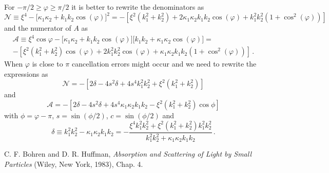 \documentclass[onecolumn%
              ,superscriptaddress%
              ,aps%
              ,pra]{revtex4}
\begin{document}
For $-\pi/2 \geq \varphi \geq \pi/2$ it is better to rewrite the denominators as
\begin{equation}
\mathcal{N} \equiv \xi^4-\big[\kappa_1\kappa_2+k_1k_2\cos(\varphi)\big]^2 = -\left[\xi^2(k_1^2 + k_2^2) + 2 \kappa_1 \kappa_2 k_1 k_2 \cos(\varphi) + k_1^2 k_2^2 \left(1 + \cos^2(\varphi)\right)\right]
\end{equation}
and the numerator of $A$ as
\begin{multline}
\mathcal{A}\equiv\xi^4\cos\varphi-\big[\kappa_1\kappa_2+k_1k_2\cos(\varphi)\big] \big[k_1 k_2+\kappa_1\kappa_2\cos(\varphi)\big]= \\-\left[\xi^2(k_1^2 + k_2^2)\cos(\varphi) + 2k_1^2 k_2^2 \cos(\varphi) + \kappa_1 \kappa_2 k_1 k_2\left(1 + \cos^2(\varphi) \right)\right]\,.
\end{multline}
When $\varphi$ is close to $\pi$ cancellation errors might occur and we need to rewrite the expressions as
\begin{equation}
\mathcal{N} = -\left[ 2 \delta - 4 s^2 \delta + 4 s^4 k_1^2 k_2^2 + \xi^2(k_1^2 + k_2^2)\right]
\end{equation}
and
\begin{equation}
\mathcal{A} = -\left[2\delta - 4 s^2 \delta + 4 s^4 \kappa_1 \kappa_2 k_1 k_2 -\xi^2 (k_1^2 + k_2^2)\cos\phi\right]
\end{equation}
with $\phi = \varphi-\pi$, $s = \sin(\phi/2)$, $c = \sin(\phi/2)$ and
\begin{equation}
\delta \equiv k_1^2 k_2^2 - \kappa_1\kappa_2 k_1 k_2 = - \frac{\xi^4 k_1^2 k_2^2 + \xi^2(k_1^2 + k_2^2)k_1^2 k_2^2}{k_1^2k_2^2 + \kappa_1 \kappa_2 k_1 k_2}\,.
\end{equation}


\begin{thebibliography}{99}
C. F. Bohren and D. R. Huffman,
\textit{Absorption and Scattering of Light by Small Particles}
(Wiley, New York, 1983), Chap. 4.

\end{thebibliography}
\end{document}
